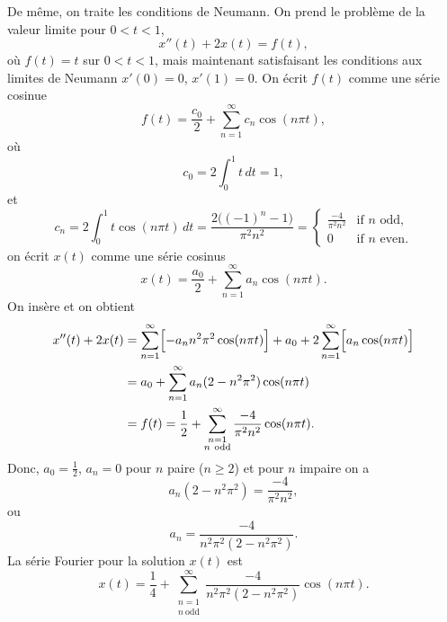\begin{example}
De même, on traite les conditions de Neumann.
On prend le problème de la valeur limite pour $0 < t < 1$,
\begin{equation*}
x''(t) + 2 x(t) = f(t) ,
\end{equation*}
où $f(t) = t$ sur $0 < t < 1$, mais maintenant satisfaisant
les conditions aux limites de Neumann
$x'(0) = 0$, $x'(1)=0$.
On écrit $f(t)$ comme une série cosinue
\begin{equation*}
f(t) = \frac{c_0}{2} + \sum_{n=1}^\infty c_n \cos (n \pi t) ,
\end{equation*}
où
\begin{equation*}
c_0 = 2 \int_0^1 t \,dt = 1 ,
\end{equation*}
et
\begin{equation*}
c_n = 2 \int_0^1 t \cos (n \pi t) \,dt =
\frac{2\bigl({(-1)}^n-1\bigr)}{\pi^2 n^2} = 
\begin{cases}
\frac{-4}{\pi^2 n^2} & \text{if } n \text{ odd} , \\
0 & \text{if } n \text{ even}.
\end{cases}
\end{equation*}
on écrit $x(t)$ comme une série cosinus
\begin{equation*}
x(t) = \frac{a_0}{2} + \sum_{n=1}^\infty a_n \cos (n \pi t) .
\end{equation*}
On insère et on obtient
\begin{equation*}
\begin{split}
x''(t) + 2 x(t) & =
\sum_{n=1}^\infty \Bigl[ - a_n n^2 \pi^2 \cos (n \pi t) \Bigr]
+
a_0 +
2
\sum_{n=1}^\infty \Bigl[ a_n \cos (n \pi t) \Bigr]
\\
& =
a_0 +
\sum_{n=1}^\infty a_n (2 - n^2 \pi^2 ) \cos (n \pi t)
\\
& = f(t)
=
\frac{1}{2} +
\sum_{\substack{n=1\\n~\text{odd}}}^\infty
\frac{-4}{\pi^2 n^2} \cos (n \pi t) .
\end{split}
\end{equation*}
Donc, $a_0 = \frac{1}{2}$, $a_n = 0$ pour $n$ paire ($n \geq 2$) et pour
$n$ impaire on a
\begin{equation*}
a_n (2 - n^2 \pi^2)
=
\frac{-4}{\pi^2 n^2} ,
\end{equation*}
ou
\begin{equation*}
a_n
=
\frac{-4}{n^2 \pi^2 (2 - n^2 \pi^2)} .
\end{equation*}
La série Fourier pour la solution $x(t)$ est
\begin{equation*}
x(t) = 
\frac{1}{4} +
\sum_{\substack{n=1\\n~\text{odd}}}^\infty
\frac{-4}{n^2 \pi^2 (2 - n^2 \pi^2)} 
\cos (n \pi t) .
\end{equation*}
\end{example}

